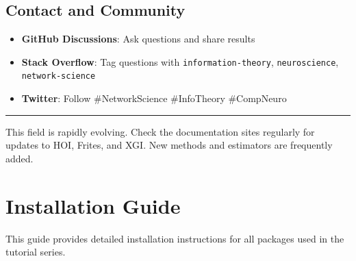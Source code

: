 \documentclass[
  11pt,
  letterpaper,
  oneside,
  openany]{book}
\providecommand{\tightlist}{%
  \setlength{\itemsep}{0pt}\setlength{\parskip}{0pt}}
\begin{document}
\section*{Contact and Community}\label{contact-and-community}


\begin{itemize}
\tightlist
\item
  \textbf{GitHub Discussions}: Ask questions and share results
\item
  \textbf{Stack Overflow}: Tag questions with
  \texttt{information-theory}, \texttt{neuroscience},
  \texttt{network-science}
\item
  \textbf{Twitter}: Follow \#NetworkScience \#InfoTheory \#CompNeuro
\end{itemize}

\begin{center}\rule{0.5\linewidth}{0.5pt}\end{center}

\begin{tcolorbox}[enhanced jigsaw, colbacktitle=quarto-callout-note-color!10!white, colframe=quarto-callout-note-color-frame, toprule=.15mm, toptitle=1mm, bottomtitle=1mm, leftrule=.75mm, titlerule=0mm, title=\textcolor{quarto-callout-note-color}{\faInfo}\hspace{0.5em}{Keeping Current}, arc=.35mm, rightrule=.15mm, opacityback=0, breakable, opacitybacktitle=0.6, bottomrule=.15mm, left=2mm, coltitle=black, colback=white]

This field is rapidly evolving. Check the documentation sites regularly
for updates to HOI, Frites, and XGI. New methods and estimators are
frequently added.

\end{tcolorbox}

\cleardoublepage
{}
{}
\appendix

\chapter*{Installation Guide}\label{installation-guide}


This guide provides detailed installation instructions for all packages
used in the tutorial series.
\end{document}
